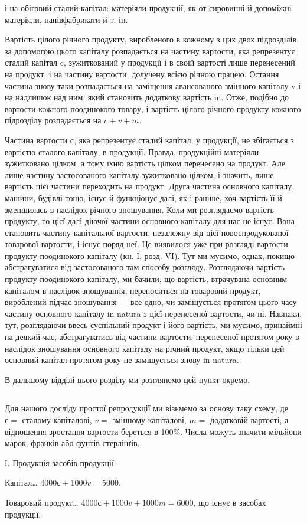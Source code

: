 \parcont{}  %
і на обіговий сталий капітал: матеріяли продукції, як от сировинні й допоміжні
матеріяли, напівфабрикати й т. ін.

Вартість цілого річного продукту, виробленого в кожному з цих
двох підрозділів за допомогою цього капіталу розпадається на частину
вартости, яка репрезентує сталий капітал c, зужиткований у продукції і в
своїй вартості лише перенесений на продукт, і на частину вартости, долучену
всією річною працею. Остання частина знову таки розпадається
на заміщення авансованого змінного капіталу v і на надлишок над ним,
який становить додаткову вартість m. Отже, подібно до вартости кожного
поодинокого товару, і вартість цілого річного продукту кожного
підрозділу розпадається на $c + v + m$.

Частина вартости $с$, яка репрезентує сталий капітал, 
у продукції, не збігається з вартістю сталого капіталу, 
в продукції. Правда, продукційні матеріяли зужитковано цілком, а тому
їхню вартість цілком перенесено на продукт. Але лише частину застосованого
 капіталу зужитковано цілком, і значить, лише вартість
цієї частини переходить на продукт. Друга частина основного капіталу,
машини, будівлі тощо, існує й функціонує далі, як і раніше, хоч
вартість її й зменшилась в наслідок річного зношування. Коли ми розглядаємо
вартість продукту, то цієї далі діючої частини основного капіталу
для нас не існує. Вона становить частину капітальної вартости, незалежну
від цієї новоспродукованої товарової вартости, і існує поряд неї. Це
виявилося уже при розгляді вартости продукту поодинокого капіталу
(кн. І, розд. VI). Тут ми мусимо, однак, покищо абстрагуватися від застосованого
там способу розгляду. Розглядаючи вартість продукту поодинокого
капіталу, ми бачили, що вартість, втрачувана основним капіталом
в наслідок зношування, переноситься на товаровий продукт,
вироблений підчас зношування — все одно, чи заміщується протягом цього
часу частину основного капіталу in natura з цієї перенесеної вартости,
чи ні. Навпаки, тут, розглядаючи ввесь суспільний продукт і його вартість,
ми мусимо, принаймні на деякий час, абстрагуватись від частини
вартости, перенесеної протягом року в наслідок зношування основного
капіталу на річний продукт, якщо тільки цей основний капітал протягом
року не заміщується знову in natura.

В дальшому відділі цього розділу ми розглянемо цей пункт окремо.
\pfbreak
Для нашого досліду простої репродукції ми візьмемо за основу таку схему,
де $с =$ сталому капіталові, $v =$ змінному капіталові, $m =$ додатковій
вартості, а відношення зростання вартости  береться в 100\%. Числа
можуть значити мільйони марок, франків або фунтів стерлінґів.

І. Продукція засобів продукції:

Капітал\dots{} $4000с + 1000v = 5000$.

Товаровий продукт\dots{} $4000с + 1000v + 1000m = 6000$, що існує
в засобах продукції.
\parbreak{}  %
